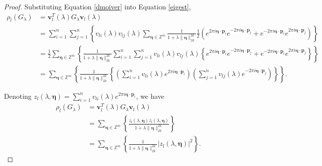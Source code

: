 \documentclass[10pt,a4paper]{amsart}
\begin{document}
\begin{proof}
Substituting Equation \ref{dmoiver} into Equation \ref{eigest},
\begin{equation}\label{eigenest_cont}
    \begin{aligned}
        \rho_l(G_{\lambda}) &= \boldsymbol{v}_l^T(\lambda)G_{\lambda}\boldsymbol{v}_l(\lambda)\\
        &= \sum\limits_{i=1}^n\sum\limits_{j=1}^n\left\{v_{li}(\lambda)v_{lj}(\lambda)\sum_{\boldsymbol{\eta}\in\mathbb{Z}^m} \frac{1}{1+\lambda\|\boldsymbol{\eta}\|_{2k}^{2k}} \frac{1}{2}\left(e^{2\pi i \boldsymbol{\eta}\cdot\boldsymbol{p}_i } e^{-2\pi i \boldsymbol{\eta}\cdot\boldsymbol{p}_j} + e^{-2\pi i \boldsymbol{\eta}\cdot\boldsymbol{p}_i } e^{2\pi i \boldsymbol{\eta}\cdot\boldsymbol{p}_j}\right)\right\}\\
        &= \frac{1}{2}\sum_{\boldsymbol{\eta}\in\mathbb{Z}^m}\left\{ \frac{1}{1+\lambda\|\boldsymbol{\eta}\|_{2k}^{2k}}\sum\limits_{i=1}^n\sum\limits_{j=1}^n v_{li}(\lambda)v_{lj}(\lambda)\left\{e^{2\pi i \boldsymbol{\eta}\cdot\boldsymbol{p}_i } e^{-2\pi i \boldsymbol{\eta}\cdot\boldsymbol{p}_j} + e^{-2\pi i \boldsymbol{\eta}\cdot\boldsymbol{p}_i } e^{2\pi i \boldsymbol{\eta}\cdot\boldsymbol{p}_j}
\right\} \right\}\\
        &= \sum_{\boldsymbol{\eta}\in\mathbb{Z}^m}\left\{ \frac{1}{1+\lambda\|\boldsymbol{\eta}\|_{2k}^{2k}}\left\{\left( \sum\limits_{i=1}^n v_{li}(\lambda)e^{2\pi i \boldsymbol{\eta}\cdot\boldsymbol{p}_i } \right) \left( \sum\limits_{j=1}^n v_{lj}(\lambda)e^{-2\pi i \boldsymbol{\eta}\cdot\boldsymbol{p}_j } \right) \right\} \right\}. 
\end{aligned}
\end{equation}

Denoting $z_l(\lambda,\boldsymbol{\eta}) = \sum\limits_{i=1}^n v_{li}(\lambda) e^{2\pi i \boldsymbol{\eta}\cdot\boldsymbol{p}_i }$, we have
\begin{equation}\label{eigenest_cont2}
\begin{aligned}
    \rho_l(G_{\lambda}) &= \boldsymbol{v}_l^T(\lambda)G_{\lambda}\boldsymbol{v}_l(\lambda)\\
    &= \sum_{\boldsymbol{\eta}\in\mathbb{Z}^m}\left\{ \frac{z_l(\lambda,\boldsymbol{\eta})\bar{z_l}(\lambda,\boldsymbol{\eta})}{1+\lambda\|\boldsymbol{\eta}\|_{2k}^{2k}}\right\}\\
    &= \sum_{\boldsymbol{\eta}\in\mathbb{Z}^m}\left\{ \frac{1}{1+\lambda\|\boldsymbol{\eta}\|_{2k}^{2k}}\left|z_l(\lambda,\boldsymbol{\eta})\right|^2 \right\}.
\end{aligned}
\end{equation}



\end{proof}
\end{document}
